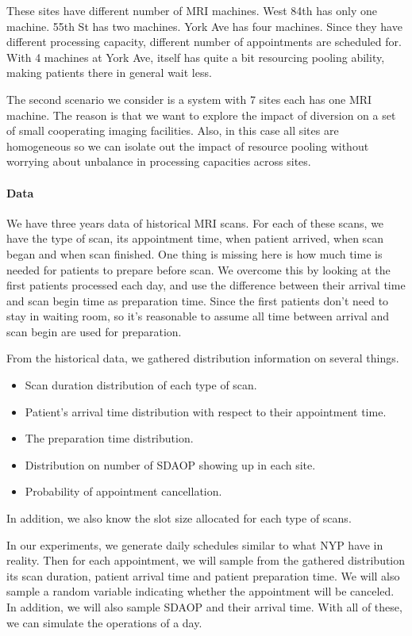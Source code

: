 These sites have different number of MRI machines. West 84th has
only one machine. 55th St has two machines. York Ave has four machines.
Since they have different processing capacity, different number of
appointments are scheduled for. With 4 machines
at York Ave, itself has quite a bit resourcing pooling ability, making
patients there in general wait less.

The second scenario we consider is a system with 7 sites each has one
MRI machine. The reason is that we want to explore the impact of
diversion on a set of small cooperating imaging facilities. Also,
in this case all sites are homogeneous so we can isolate out
the impact of resource pooling without worrying about unbalance in
processing capacities across sites.

\paragraph{Data}

We have three years data of historical MRI scans. For each of these
scans, we have the type of scan, its appointment time, when patient
arrived, when scan began and when scan finished. One thing is missing
here is how much time is needed for patients to prepare before scan.
We overcome this by looking at the first patients processed each day,
and use the difference between their arrival time and scan begin time
as preparation time. Since the first patients don't need to stay in
waiting room, so it's reasonable to assume all time between arrival
and scan begin are used for preparation.

From the historical data, we gathered distribution information on
several things.
\begin{itemize}
\item Scan duration distribution of each type of scan.
\item Patient's arrival time distribution with respect to
their appointment time.
\item The preparation time distribution.
\item Distribution on number of SDAOP showing up in each site.
\item Probability of appointment cancellation.
\end{itemize}
In addition, we also know the slot size allocated for each type of scans.

In our experiments, we generate daily schedules similar to what NYP have in reality.
Then for each appointment, we will sample from the gathered distribution its
scan duration, patient arrival time and patient preparation time. We will also
sample a random variable indicating whether the appointment will be canceled.
In addition, we will also sample SDAOP and their arrival time. With all of these,
we can simulate the operations of a day.

